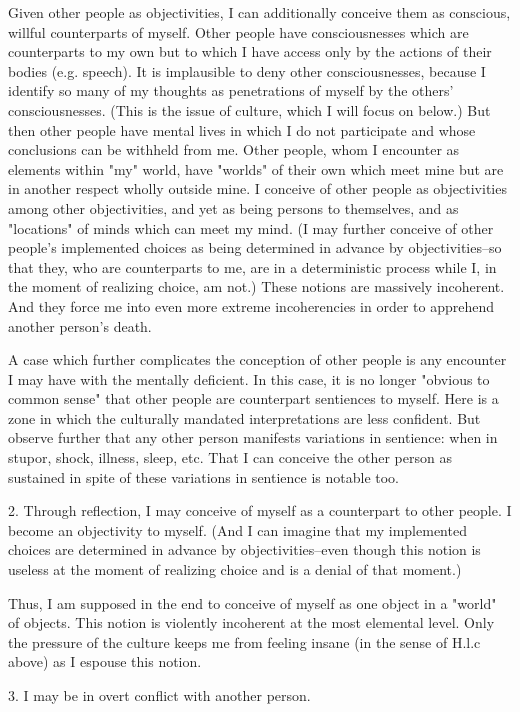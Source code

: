Given other people as objectivities, I can additionally conceive them as conscious, willful counterparts of myself. Other people have consciousnesses which are counterparts to my own but to which I have access only by the actions of their bodies (e.g. speech). It is implausible to deny other consciousnesses, because I identify so many of my thoughts as penetrations of myself by the others' consciousnesses. (This is the issue of culture, which I will focus on below.) But then other people have mental lives in which I do not participate and whose conclusions can be withheld from me. Other people, whom I encounter as elements within "my" world, have "worlds" of their own which meet mine but are in another respect wholly outside mine. I conceive of other people as objectivities among other objectivities, and yet as being persons to themselves, and as "locations" of minds which can meet my mind. (I may further conceive of other people's implemented choices as being determined in advance by objectivities--so that they, who are counterparts to me, are in a deterministic process while I, in the moment of realizing choice, am not.) These notions are massively incoherent. And they force me into even more extreme incoherencies in order to apprehend another person's death.

A case which further complicates the conception of other people is any encounter I may have with the mentally deficient. In this case, it is no longer "obvious to common sense" that other people are counterpart sentiences to myself. Here is a zone in which the culturally mandated interpretations are less confident. But observe further that any other person manifests variations in sentience: when in stupor, shock, illness, sleep, etc. That I can conceive the other person as sustained in spite of these variations in sentience is notable too.

2. Through reflection, I may conceive of myself as a counterpart to other people. I become an objectivity to myself. (And I can imagine that my implemented choices are determined in advance by objectivities--even though this notion is useless at the moment of realizing choice and is a denial of that moment.)

Thus, I am supposed in the end to conceive of myself as one object in a "world" of objects. This notion is violently incoherent at the most elemental level. Only the pressure of the culture keeps me from feeling insane (in the sense of H.l.c above) as I espouse this notion.

3. I may be in overt conflict with another person.

